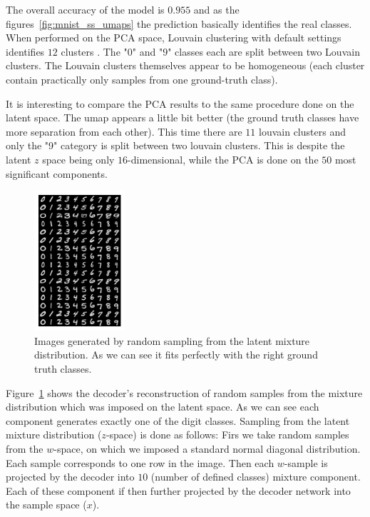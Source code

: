 \documentclass[11pt, a4paper]{report}
\theoremstyle{plain}
\theoremstyle{definition}
\theoremstyle{remark}
\begin{document}
The overall accuracy of the model is $0.955$ and as
the figures~\ref{fig:mnist_ss_umaps} the prediction basically identifies the
real classes.
When performed on the PCA space, Louvain clustering with default settings identifies $12$ clusters
. The "$0$" and "$9$" classes each are split
between two Louvain clusters. The Louvain clusters themselves appear to be
homogeneous (each cluster contain practically only samples from one ground-truth
class).

It is interesting to compare the PCA results to the same procedure done on the
latent space.
The umap appears a little bit better (the ground truth classes have more
separation from each other).
This time there are $11$ louvain clusters and only the "9"
category is split between two louvain clusters.
This is despite the latent $z$ space being only $16$-dimensional, while the PCA
is done on the $50$ most significant components.

\begin{figure}[h]
\centering
\includegraphics[width=0.3\textwidth]{images/gmmvae_mnist_ss_samples.png}
\caption{Images generated by random sampling from the latent mixture
distribution. As we can see it fits perfectly with the right ground truth
classes.}
\label{fig:mnist_ss_samples}
\end{figure}

Figure~\ref{fig:mnist_ss_samples} shows the decoder's reconstruction of random
samples from the mixture distribution which was imposed on the latent space.
As we can see each component generates exactly one of the digit classes.
Sampling from the latent mixture distribution ($z$-space) is done as follows:
Firs we take random samples from the $w$-space, on which we imposed a standard
normal diagonal distribution. Each sample corresponds to one row in the image.
Then each $w$-sample is projected by the decoder into $10$ (number of defined
classes) mixture component. Each of these component if then further projected by
the decoder network into the sample space ($x$). 
\end{document}
